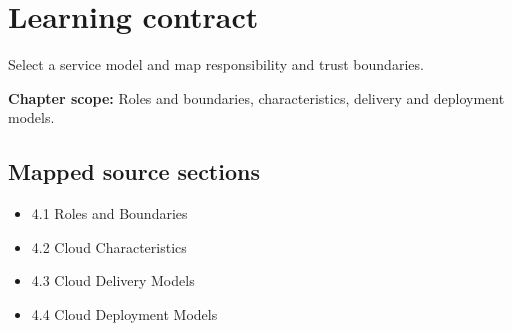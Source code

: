 \documentclass[10pt,letterpaper]{article}
\begin{document}
\sourceStatement
\tableofcontents
\newpage
\section{Learning contract}
\begin{takeaway}
Select a service model and map responsibility and trust boundaries.
\end{takeaway}
\textbf{Chapter scope:} Roles and boundaries, characteristics, delivery and deployment models.\\
\subsection{Mapped source sections}
\begin{itemize}
\item 4.1 Roles and Boundaries
\item 4.2 Cloud Characteristics
\item 4.3 Cloud Delivery Models
\item 4.4 Cloud Deployment Models
\end{itemize}
\end{document}
